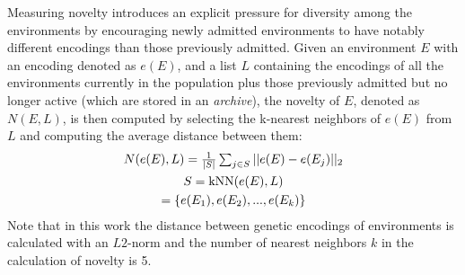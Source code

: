 \documentclass{article}
\newcommand{\jc}[1]{\comments{\textcolor{deepForestGreen}{[JC: #1]}}}
\newcommand{\ks}[1]{\comments{\textcolor{purple}{[Ken: #1]}}}
\newcommand{\rw}[1]{\comments{\textcolor{blue}{[Rui: #1]}}}
\newcommand{\comments}[1]{#1}
\begin{document}
Measuring novelty introduces an explicit pressure for diversity among the environments by encouraging newly admitted environments to have notably different encodings than those previously admitted.
Given an environment $E$ with an encoding denoted as $e(E)$, and a list $L$
containing the encodings of all the environments currently in the population plus those previously admitted but no longer active (which are stored in an \emph{archive}), 
the novelty of $E$, denoted as $N(E, L)$, is then computed by selecting the k-nearest neighbors of $e(E)$ from $L$ and computing the average distance between them:
\begin{gather*}
\scalebox{1.}{$N(e(E), L) = \frac{1}{\vert{S}\vert}\sum_{j\in{S}}\vert\vert{e(E) - e(E_{j})}\vert\vert_{2}$}\\
\scalebox{1.}{$S = \textrm{kNN}(e(E), L)$}\\
\scalebox{1.}{$
= \{e(E_{1}), e(E_{2}), ..., e(E_{k})\}$}
\end{gather*}
Note that in this work the distance between genetic encodings of environments is calculated with an $L2$-norm and the number of nearest neighbors $k$ in the calculation of novelty is 5.

\end{document}
